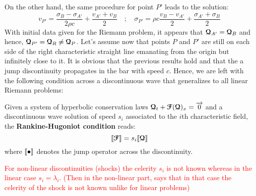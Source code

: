 On the other hand, the same procedure for point $P'$ leads to the solution:
\begin{equation}
  \label{eq:elastic_solution_Q}
  v_{P'} = \frac{\sigma_B - \sigma_{A'}}{2\rho c} + \frac{v_{A'}+v_B}{2} \quad ; \quad \sigma_{P'} = \rho c\frac{v_B - v_{A'}}{2} + \frac{\sigma_{A'}+\sigma_B}{2}
\end{equation}
With initial data given for the Riemann problem, it appears that ${\boldsymbol{\mathcal{Q}}}_{A'}={\boldsymbol{\mathcal{Q}}}_{B}$ and hence, ${\boldsymbol{\mathcal{Q}}}_{P'}={\boldsymbol{\mathcal{Q}}}_{R} \ne {\boldsymbol{\mathcal{Q}}}_{P}$. Let's assume now that points $P$ and $P'$ are still on each side of the right characteristic straight line emanating from the origin but infinitely close to it. It is obvious that the previous results hold and that the a jump discontinuity propagates in the bar with speed $c$. Hence, we are left with the following condition across a discontinuous wave \cite{Toro} that generalizes to all linear Riemann problems:
\begin{definition}
Given a system of hyperbolic conservation laws ${\boldsymbol{\mathcal{Q}}}_t + {\boldsymbol{\mathcal{F}}}({\boldsymbol{\mathcal{Q}}})_x={\overrightarrow{0}}$ and a discontinuous wave solution of speed $s_i$ associated to the $i$th characteristic field, the \textbf{Rankine-Hugoniot condition} reads:
\begin{equation}
  \label{eq:rankine-hugoniot}
  \llbracket  {\boldsymbol{\mathcal{F}}} \rrbracket = s_i \llbracket  {\boldsymbol{\mathcal{Q}}} \rrbracket
\end{equation}
where $\llbracket \bullet \rrbracket$ denotes the jump operator across the discontinuity.  
\end{definition}


\textcolor{Red}{For non-linear discontinuities (shocks) the celerity $s_i$ is not known whereas in the linear case $s_i=\lambda_i$. (Then in the non-linear part, says that in that case the celerity of the shock is not known unlike for linear problems)}
